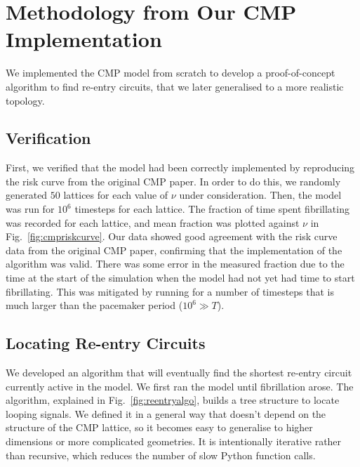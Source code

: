\clearpage
\section{Methodology from Our CMP Implementation}

We implemented the CMP model from scratch to develop a proof-of-concept algorithm to find re-entry circuits, that we later generalised to a more realistic topology.

\subsection{Verification}

First, we verified that the model had been correctly implemented by reproducing the risk curve from the original CMP paper. In order to do this, we randomly generated $50$ lattices for each value of $\nu$ under consideration. Then, the model was run for $10^6$ timesteps for each lattice. The fraction of time spent fibrillating was recorded for each lattice, and mean fraction was plotted against $\nu$ in Fig.~\ref{fig:cmpriskcurve}. Our data showed good agreement with the risk curve data from the original CMP paper, confirming that the implementation of the algorithm was valid. There was some error in the measured fraction due to the time at the start of the simulation when the model had not yet had time to start fibrillating. This was mitigated by running for a number of timesteps that is much larger than the pacemaker period ($10^6 \gg T$).

\subsection{Locating Re-entry Circuits} \label{sec:locating}

We developed an algorithm that will eventually find the shortest re-entry circuit currently active in the model. We first ran the model until fibrillation arose. The algorithm, explained in Fig.~\ref{fig:reentryalgo}, builds a tree structure to locate looping signals. We defined it in a general way that doesn't depend on the structure of the CMP lattice, so it becomes easy to generalise to higher dimensions or more complicated geometries. It is intentionally iterative rather than recursive, which reduces the number of slow Python function calls.

